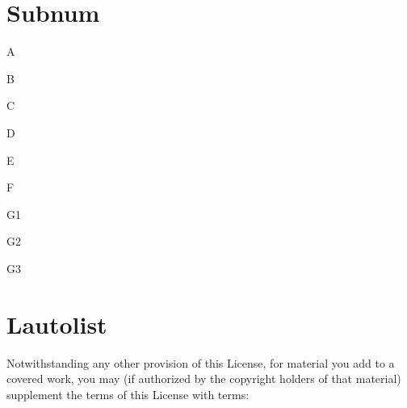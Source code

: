 \documentclass{article}
\begin{document}
\raggedright

\section{Subnum}

\begin{Subnum}

\item A

\begin{Subnum}

\item B

\begin{Subnum}

\item C

\begin{Subnum}

\item D

\begin{Subnum}

\item E

\begin{Subnum}

\item F

\begin{Subnum}

\item G1

\item G2

\item G3

\end{Subnum}
\end{Subnum}
\end{Subnum}
\end{Subnum}
\end{Subnum}
\end{Subnum}
\end{Subnum}

\section{Lautolist}

Notwithstanding any other provision of this License, for material you add to a covered work, you may (if authorized by the copyright holders of that material) supplement the terms of this License with terms:
\end{document}
